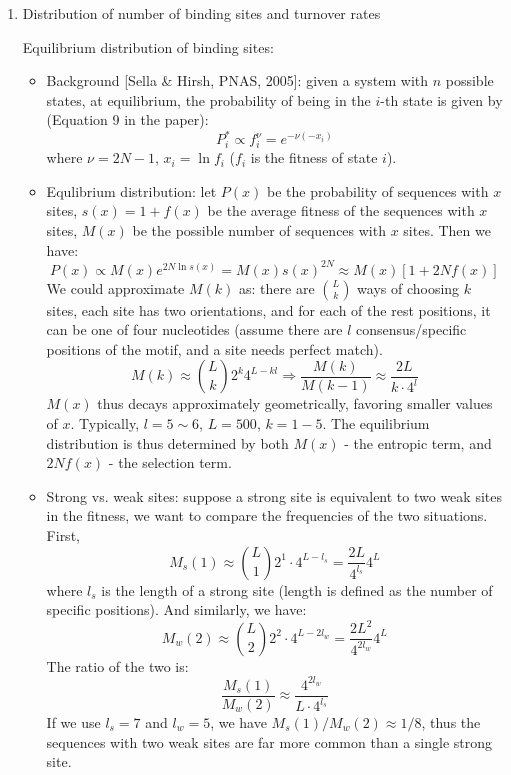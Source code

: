 \documentclass[11pt]{article}
\begin{document}
\begin{enumerate}
\item{Distribution of number of binding sites and turnover rates}

Equilibrium distribution of binding sites: 
\begin{itemize}
\item Background [Sella \& Hirsh, PNAS, 2005]: given a system with $n$ possible states, at equilibrium, the probability of being in the $i$-th state is given by (Equation 9 in the paper): 
\begin{equation}
P_i^* \propto f_i^{\nu} = e^{-\nu(-x_i)}	
\end{equation}
where $\nu = 2N - 1$, $x_i = \ln f_i$ ($f_i$ is the fitness of state $i$). 

\item Equlibrium distribution: let $P(x)$ be the probability of sequences with $x$ sites, $s(x) = 1 + f(x)$ be the average fitness of the sequences with $x$ sites, $M(x)$ be the possible number of sequences with $x$ sites. Then we have: 
\begin{equation}
P(x) \propto M(x) e^{2N \ln s(x)} = M(x) s(x)^{2N} \approx M(x)\left[ 1 + 2N f(x) \right]	
\end{equation}
We could approximate $M(k)$ as: there are $L \choose k$ ways of choosing $k$ sites, each site has two orientations, and for each of the rest positions, it can be one of four nucleotides (assume there are $l$ consensus/specific positions of the motif, and a site needs perfect match).
\begin{equation}
M(k) \approx {L \choose k} 2^k 4^{L - kl}	 \Rightarrow \frac{M(k)}{M(k-1)} \approx \frac{2L}{k \cdot 4^l}
\end{equation}
$M(x)$ thus decays approximately geometrically, favoring smaller values of $x$. Typically, $l = 5 \sim 6$, $L = 500$, $k = 1 - 5$. The equilibrium distribution is thus determined by both $M(x)$ - the entropic term, and $2Nf(x)$ - the selection term. 

\item Strong vs. weak sites: suppose a strong site is equivalent to two weak sites in the fitness, we want to compare the frequencies of the two situations. First, 
\begin{equation}
M_s(1) \approx {L \choose 1} 2^1 \cdot 4^{L-l_s} = \frac{2L}{4^{l_s}} 4^L	
\end{equation}
where $l_s$ is the length of a strong site (length is defined as the number of specific positions). And similarly, we have: 
\begin{equation}
M_w(2) \approx {L \choose 2} 2^2 \cdot 4^{L-2l_w} = \frac{2L^2}{4^{2l_w}} 4^L	
\end{equation}
The ratio of the two is: 
\begin{equation}
\frac{M_s(1)}{M_w(2)} \approx \frac{4^{2l_w}}{L \cdot 4^{l_s}}	
\end{equation}
If we use $l_s = 7$ and $l_w = 5$, we have $M_s(1)/M_w(2) \approx 1/8$, thus the sequences with two weak sites are far more common than a single strong site. 
\end{itemize}


\end{enumerate}
\end{document}
